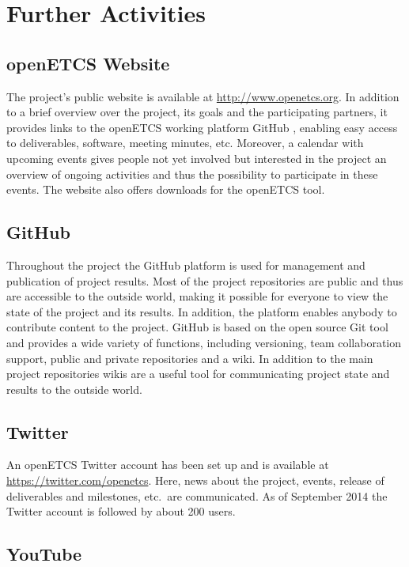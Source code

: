 \section{Further Activities}\label{sct:further_activities}

\subsection{openETCS Website}
The project's public website is available at \url{http://www.openetcs.org}. In addition to a brief overview over the project, its goals and the participating partners, it provides links to the openETCS working platform GitHub \cite{github}, enabling easy access to deliverables, software, meeting minutes, etc. Moreover, a calendar with upcoming events gives people not yet involved but interested in the project an overview of ongoing activities and thus the possibility to participate in these events. The website also offers downloads for the openETCS tool.



\subsection{GitHub}

Throughout the project the GitHub platform \cite{github} is used for management and publication of project results. Most of the project repositories are public and thus are accessible to the outside world, making it possible for everyone to view the state of the project and its results. In addition, the platform enables anybody to contribute content to the project. GitHub is based on the open source Git tool \cite{gittool} and provides a wide variety of functions, including versioning, team collaboration support, public and private repositories and a wiki. In addition to the main project repositories wikis are a useful tool for communicating project state and results to the outside world.

\subsection{Twitter}

An openETCS Twitter account has been set up and is available at \url{https://twitter.com/openetcs}. Here, news about the project, events, release of deliverables and milestones, etc.~are communicated. As of September 2014 the Twitter account is followed by about 200 users.

\subsection{YouTube}


